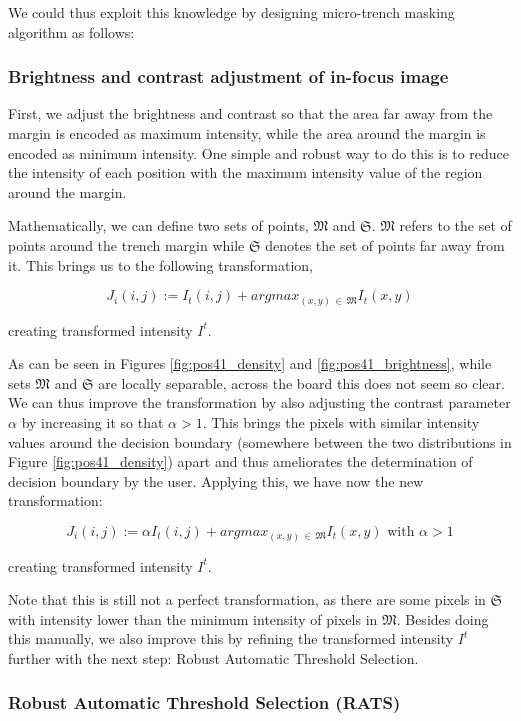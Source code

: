 \documentclass[pdftex,12pt,a4paper]{report}
\begin{document}
We could thus exploit this knowledge by designing micro-trench masking algorithm as follows:

\subsubsection*{Brightness and contrast adjustment of in-focus image}

First, we adjust the brightness and contrast so that the area far away from the margin is encoded as maximum intensity, while the area around the margin is encoded as minimum intensity. One simple and robust way to do this is to reduce the intensity of each position with the maximum intensity value of the region around the margin.

Mathematically, we can define two sets of points, $\mathfrak{M}$ and $\mathfrak{S}$. $\mathfrak{M}$ refers to the set of points around the trench margin while $\mathfrak{S}$ denotes the set of points far away from it. This brings us to the following transformation,

$$
J_i(i, j) := I_t(i, j) + argmax_{(x, y) \, \in \, \mathfrak{M}}{I_t(x, y)}
$$

creating transformed intensity $I^t$.

As can be seen in Figures \ref{fig:pos41_density} and \ref {fig:pos41_brightness}, while sets $\mathfrak{M}$ and $\mathfrak{S}$ are locally separable, across the board this does not seem so clear. We can thus improve the transformation by also adjusting the contrast parameter $\alpha$ by increasing it so that $\alpha > 1$. This brings the pixels with similar intensity values around the decision boundary (somewhere between the two distributions in Figure \ref{fig:pos41_density}) apart and thus ameliorates the determination of decision boundary by the user. Applying this, we have now the new transformation:

$$
J_i(i, j) := \alpha I_t(i, j) + argmax_{(x, y) \, \in \, \mathfrak{M}}{I_t(x, y)} \text{ with } \alpha > 1
$$

creating transformed intensity $I^t$.

Note that this is still not a perfect transformation, as there are some pixels in $\mathfrak{S}$ with intensity lower than the minimum intensity of pixels in $\mathfrak{M}$. Besides doing this manually, we also improve this by refining the transformed intensity $I^t$ further with the next step: Robust Automatic Threshold Selection.

\subsubsection*{Robust Automatic Threshold Selection (RATS)}
\end{document}
